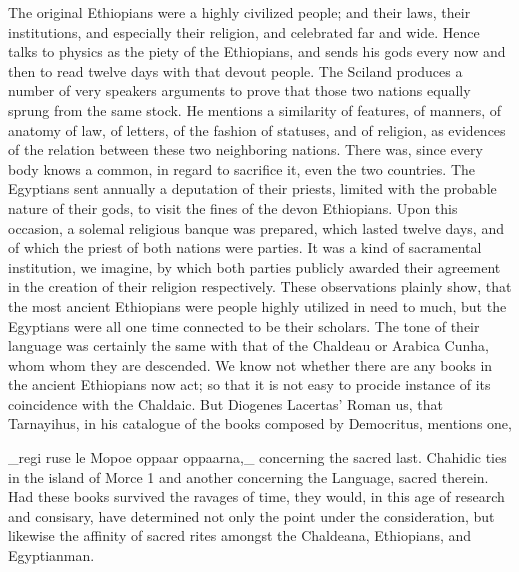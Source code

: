 \documentclass{article}
\begin{document}
The original Ethiopians were a highly civilized people; and their laws, their institutions, and especially their religion, and celebrated far and wide. Hence talks to physics as the piety of the Ethiopians, and sends his gods every now and then to read twelve days with that devout people. The Sciland produces a number of very speakers arguments to prove that those two nations equally sprung from the same stock. He mentions a similarity of features, of manners, of anatomy of law, of letters, of the fashion of statuses, and of religion, as evidences of the relation between these two neighboring nations. There was, since every body knows a common, in regard to sacrifice it, even the two countries. The Egyptians sent annually a deputation of their priests, limited with the probable nature of their gods, to visit the fines of the devon Ethiopians. Upon this occasion, a solemal religious banque was prepared, which lasted twelve days, and of which the priest of both nations were parties. It was a kind of sacramental institution, we imagine, by which both parties publicly awarded their agreement in the creation of their religion respectively. These observations plainly show, that the most ancient Ethiopians were people highly utilized in need to much, but the Egyptians were all one time connected to be their scholars. The tone of their language was certainly the same with that of the Chaldeau or Arabica Cunha, whom whom they are descended. We know not whether there are any books in the ancient Ethiopians now act; so that it is not easy to procide instance of its coincidence with the Chaldaic. But Diogenes Lacertas’ Roman us, that Tarnayihus, in his catalogue of the books composed by Democritus, mentions one,

\_regi ruse le Mopoe oppaar oppaarna,\_ concerning the sacred last. Chahidic ties in the island of Morce 1 and another concerning the Language, sacred therein. Had these books survived the ravages of time, they would, in this age of research and consisary, have determined not only the point under the consideration, but likewise the affinity of sacred rites amongst the Chaldeana, Ethiopians, and Egyptianman.
\end{document}
